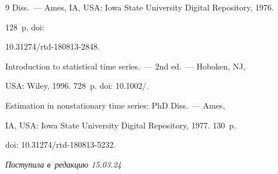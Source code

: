 {{\begin{thebibliography}{9}
Diss.~--- Ames, IA, USA: Iowa State University Digital Repository, 1976. 


128~p. doi: 


10.31274\!/\!rtd-180813-2848. 






 Introduction to statistical time series.~--- 2nd ed.~--- Hoboken, NJ, 


USA: Wiley, 1996. 728~p. doi: 10.1002\!/.




 Estimation in nonstationary time series: PhD Diss.~--- Ames, 


IA, USA: Iowa State University Digital Repository, 1977. 130~p.


doi: 10.31274\!/\!rtd-180813-5232.




     \end{thebibliography}


} }











\vspace*{-6pt}





\hfill{\small\textit{Поступила в~редакцию 15.03.24}}

































